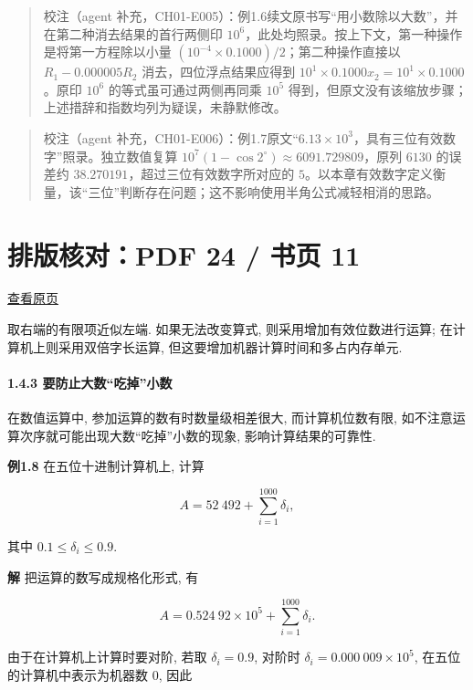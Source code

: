 \documentclass[
  10pt,
  a4paper,
]{article}
\begin{document}
\begin{quote}
校注（agent
补充，CH01-E005）：例1.6续文原书写``用小数除以大数''，并在第二种消去结果的首行两侧印
\(10^6\)，此处均照录。按上下文，第一种操作是将第一方程除以小量
\((10^{-4}\times0.1000)/2\)；第二种操作直接以 \(R_1-0.000005R_2\)
消去，四位浮点结果应得到 \(10^1\times0.1000x_2=10^1\times0.1000\)。原印
\(10^6\) 的等式虽可通过两侧再同乘 \(10^5\)
得到，但原文没有该缩放步骤；上述措辞和指数均列为疑误，未静默修改。
\end{quote}

\begin{quote}
校注（agent
补充，CH01-E006）：例1.7原文``\(6.13\times10^3\)，具有三位有效数字''照录。独立数值复算
\(10^7(1-\cos2^\circ)\approx6091.729809\)，原列 \(6130\) 的误差约
\(38.270191\)，超过三位有效数字所对应的
\(5\)。以本章有效数字定义衡量，该``三位''判断存在问题；这不影响使用半角公式减轻相消的思路。
\end{quote}

\newpage

\section{排版核对：PDF 24 / 书页
11}\label{ux6392ux7248ux6838ux5bf9pdf-24-ux4e66ux9875-11}

\href{../../../source-images/pdf-024.jpeg}{查看原页}

取右端的有限项近似左端. 如果无法改变算式, 则采用增加有效位数进行运算;
在计算机上则采用双倍字长运算, 但这要增加机器计算时间和多占内存单元.

\paragraph{1.4.3
要防止大数``吃掉''小数}\label{ux8981ux9632ux6b62ux5927ux6570ux5403ux6389ux5c0fux6570}

在数值运算中, 参加运算的数有时数量级相差很大, 而计算机位数有限,
如不注意运算次序就可能出现大数``吃掉''小数的现象, 影响计算结果的可靠性.

\textbf{例1.8} 在五位十进制计算机上, 计算

\[
A = 52\ 492 + \sum_{i=1}^{1000} \delta_i,
\]

其中 \(0.1 \leqslant \delta_i \leqslant 0.9\).

\textbf{解} 把运算的数写成规格化形式, 有

\[
A = 0.524\ 92 \times 10^5 + \sum_{i=1}^{1000} \delta_i.
\]

由于在计算机上计算时要对阶, 若取 \(\delta_i = 0.9\), 对阶时
\(\delta_i = 0.000\ 009 \times 10^5\), 在五位的计算机中表示为机器数 0,
因此
\end{document}
